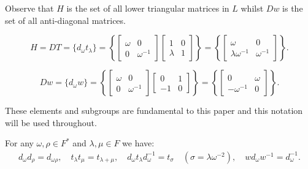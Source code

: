 Observe that $H$ is the set of all lower triangular matrices in $L$ whilst $Dw$ is the set of all anti-diagonal matrices.

\begin{equation} \label{Hlowertri} H = DT =  \{d_\omega t_\lambda\} = \left\{ \begin{bmatrix} \omega & 0 \\ 0 & \omega^{-1} \end{bmatrix} \begin{bmatrix} 1 & 0 \\ \lambda & 1 \end{bmatrix} \right\} = \left\{ \begin{bmatrix} \omega & 0 \\ \lambda \omega^{-1} & \omega^{-1} \end{bmatrix}  \right\}. \end{equation}

\begin{equation} \label{antidiag} Dw = \{ d_\omega w \} =  \left\{  \begin{bmatrix} \omega & 0 \\ 0 & \omega^{-1} \end{bmatrix} \begin{bmatrix} 0 & 1 \\ -1 & 0 \end{bmatrix} \right\} = \left\{ \begin{bmatrix} 0 & \omega \\ -\omega^{-1} & 0 \end{bmatrix}  \right\}. \end{equation}

These elements and subgroups are fundamental to this paper and this notation will be used throughout.

\begin{lemma}\label{6.1}
For any $\omega, \rho \in F^*$ and $\lambda, \mu \in F$ we have:
\begin{align*} d_\omega d_{\rho}= d_{\omega\rho}, \quad t_\lambda t_\mu = t_{\lambda + \mu}, \quad d_\omega t_\lambda d^{-1}_\omega = t_\sigma \quad \! \! (\sigma=\lambda \omega^{-2}), \quad w d_\omega w^{-1} = d^{-1}_\omega.
\end{align*} 
\end{lemma}
\vspace{0mm}

